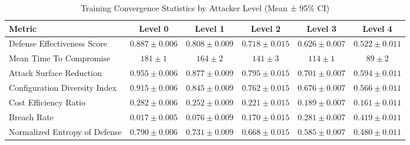 \begin{table}[htbp]
\centering
\caption{Training Convergence Statistics by Attacker Level (Mean ± 95\% CI)}
\label{tab:training_convergence}
\small
\begin{tabular}{lccccc}
\toprule
\textbf{Metric} & \textbf{Level 0} & \textbf{Level 1} & \textbf{Level 2} & \textbf{Level 3} & \textbf{Level 4} \\
\midrule
Defense Effectiveness Score & $0.887 \pm 0.006$ & $0.808 \pm 0.009$ & $0.718 \pm 0.015$ & $0.626 \pm 0.007$ & $0.522 \pm 0.011$ \\
Mean Time To Compromise & $181 \pm 1$ & $164 \pm 2$ & $141 \pm 3$ & $114 \pm 1$ & $89 \pm 2$ \\
Attack Surface Reduction & $0.955 \pm 0.006$ & $0.877 \pm 0.009$ & $0.795 \pm 0.015$ & $0.701 \pm 0.007$ & $0.594 \pm 0.011$ \\
Configuration Diversity Index & $0.915 \pm 0.006$ & $0.845 \pm 0.009$ & $0.762 \pm 0.015$ & $0.676 \pm 0.007$ & $0.566 \pm 0.011$ \\
Cost Efficiency Ratio & $0.282 \pm 0.006$ & $0.252 \pm 0.009$ & $0.221 \pm 0.015$ & $0.189 \pm 0.007$ & $0.161 \pm 0.011$ \\
Breach Rate & $0.017 \pm 0.005$ & $0.076 \pm 0.009$ & $0.170 \pm 0.015$ & $0.281 \pm 0.007$ & $0.419 \pm 0.011$ \\
Normalized Entropy of Defense & $0.790 \pm 0.006$ & $0.731 \pm 0.009$ & $0.668 \pm 0.015$ & $0.585 \pm 0.007$ & $0.480 \pm 0.011$ \\
\bottomrule
\end{tabular}
\end{table}
